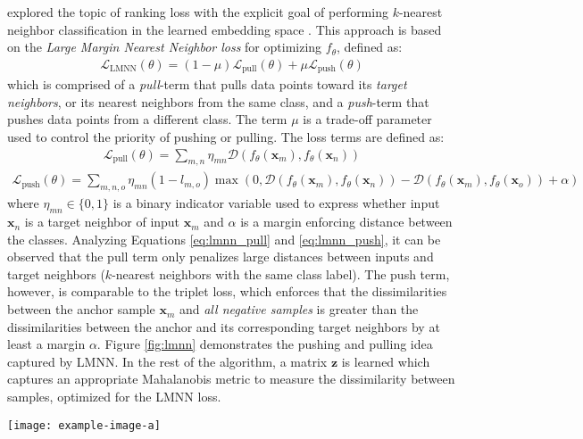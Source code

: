 		\cite{Weinberger2009LMNN} explored the topic of ranking loss with the explicit goal of performing $k$-nearest neighbor classification in the learned embedding space \citep{Hermans2017DefenseTripletLoss}.  This approach is based on the \textit{Large Margin Nearest Neighbor loss} for optimizing $f_{\theta}$, defined as:
		\begin{align}
			\mathcal{L}_{\text{LMNN}}(\theta) = (1-\mu)\mathcal{L}_{\text{pull}}(\theta) + \mu \mathcal{L}_{\text{push}}(\theta)
		\end{align}
		\noindent
		which is comprised of a \textit{pull}-term that pulls data points toward its \textit{target neighbors}, or its nearest neighbors from the same class, and a \textit{push}-term that pushes data points from a different class.  The term $\mu$ is a trade-off parameter used to control the priority of pushing or pulling. The loss terms are defined as:
		\begin{align} \label{eq:lmnn_pull}
			\mathcal{L}_{\text{pull}}(\theta) =  \sum_{m,n}\eta_{mn} \mathcal{D}(f_{\theta}(\bm{x}_{m}),f_{\theta}(\bm{x}_{n}))
		\end{align}
		\begin{align} \label{eq:lmnn_push}
		\mathcal{L}_{\text{push}}(\theta) = \sum_{m,n,o}\eta_{mn}(1-l_{m,o}) \max(0,\mathcal{D}(f_{\theta}(\bm{x}_{m}),f_{\theta}(\bm{x}_{n})) - \mathcal{D}(f_{\theta}(\bm{x}_{m}),f_{\theta}(\bm{x}_{o})) + \alpha )
		\end{align}
		\noindent
		where  $\eta_{mn} \in \{0,1\}$ is a binary indicator variable used to express whether input $\bm{x}_{n}$ is a target neighbor of input $\bm{x}_{m}$ and $\alpha$ is a margin enforcing distance between the classes.  Analyzing Equations \ref{eq:lmnn_pull} and \ref{eq:lmnn_push}, it can be observed that the pull term only penalizes large distances between inputs and target neighbors ($k$-nearest neighbors with the same class label).  The push term, however, is comparable to the triplet loss, which enforces that the dissimilarities between the anchor sample $\bm{x}_{m}$ and \textit{all negative samples} is greater than the dissimilarities between the anchor and its corresponding target neighbors by at least a margin $\alpha$.  Figure \ref{fig:lmnn} demonstrates the pushing and pulling idea captured by LMNN.  In the rest of the algorithm, a matrix $\bm{z}$ is learned which captures an appropriate Mahalanobis metric to measure the dissimilarity between samples, optimized for the LMNN loss.  
		
		
		\begin{center}
			\begin{figure*}[h]
				\centering
				\texttt{[image: example-image-a]}
				\caption[Large Margin $k$-NN]{}
				\label{fig:lmnn}
			\end{figure*}
		\end{center}
		
